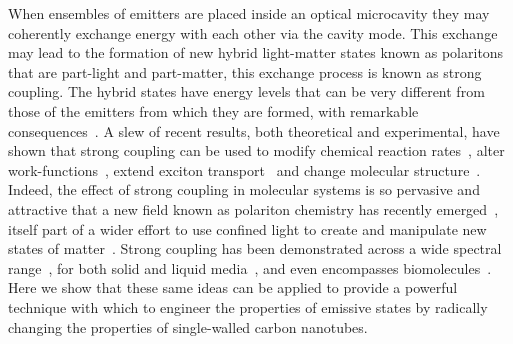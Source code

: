 \documentclass[journal=aamick,manuscript=article]{achemso}
\begin{document}
\vspace{20pt}
When ensembles of emitters are placed inside an optical microcavity they may coherently exchange energy with each other via the cavity mode.
This exchange may lead to the formation of new hybrid light-matter states known as polaritons that are part-light and part-matter, this exchange process is known as strong coupling.
The hybrid states have energy levels that can be very different from those of the emitters from which they are formed, with remarkable consequences~\cite{Ebbesen_ACSaccounts_2016_49_2403}.
A slew of recent results, both theoretical and experimental, have shown that strong coupling can be used to modify chemical reaction rates~\cite{Hutchison_AngComm_2012_51_1592}, alter work-functions~\cite{Hutchison_AdvMat_2013_25_2481}, extend exciton transport~\cite{Orgiu_NatMat_2015_14_1123,Feist_PRL_2015_114_196402} and change molecular structure~\cite{Galego_PRX_2015_5_041022}.
Indeed, the effect of strong coupling in molecular systems is so pervasive and attractive that a new field known as polariton chemistry has recently emerged~\cite{Feist_ACSPhot_2017,Kowalewski_JPCL_2016_7_2050,Herrera_PRL_2016_116_238301}, itself part of a wider effort to use confined light to create and manipulate new states of matter~\cite{Mann_NatComm_2018_9_2194}. Strong coupling has been demonstrated across a wide spectral range~\cite{Shalabney_NatComm_2015_6_5981,Long_ACSPhot_2014_2_130}, for both solid and liquid media~\cite{George_JPCL_2015_6_1027}, and even encompasses biomolecules~\cite{Coles_NatComm_2014_5_5561,Dietrich_SciAdv_2016_2_e1600666}.
Here we show that these same ideas can be applied to provide a powerful technique with which to engineer the properties of emissive states by radically changing the properties of single-walled carbon nanotubes.
\end{document}
